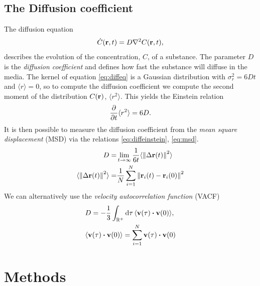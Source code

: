 \documentclass[%
aip,
jmp,%
amsmath,amssymb,
preprint,%
reprint,%
notitlepage,
a4paper]{revtex4-1}
\newcommand{\average}[1]{\langle #1 \rangle}
\begin{document}
\subsection{The Diffusion coefficient}
The diffusion equation
\begin{equation}
\dot{C}(\vb{r}, t) = D\nabla^2C(\vb{r}, t),
\label{eq:diffeq}
\end{equation}
describes the evolution of the concentration, $C$, of a substance. The parameter $D$ is the \textit{diffusion coefficient} and defines how fast the substance will diffuse in the media. The kernel of equation \ref{eq:diffeq} is a Gaussian distribution with $\sigma_r^2 = 6Dt$ and $\langle r\rangle=0$, so to compute the diffusion coefficient we compute the second moment of the distribution $C(\vb{r})$, $\langle r^2\rangle$. This yields the Einstein relation\cite{Einstein1905}
\begin{equation}
\pdv{t}\langle r^2\rangle = 6D.
\end{equation}
It is then possible to measure the diffusion coefficient from the \textit{mean square displacement} (MSD) via the relations \ref{eq:diffeinstein}, \ref{eq:msd}.
\begin{align}
\label{eq:diffeinstein}
D =& \lim_{t\rightarrow\infty} \frac{1}{6t}\langle\norm{\Delta\vb{r}(t)}^2\rangle\\
\label{eq:msd}
\langle\norm{\Delta\vb{r}(t)}^2\rangle =& \frac{1}{N}\sum_{i = 1}^{N}\norm{ \vb{r}_i(t) - \vb{r}_i(0)}^2
\end{align}
We can alternatively use the \textit{velocity autocorrelation function} (VACF)\cite{Kubo1957}
\begin{align}
\label{eq:diffvacf}
&D = -\frac{1}{3}\int_{\mathbb{R}^+}\dd{\tau} \langle \vb{v}(\tau)\dotproduct\vb{v}(0)\rangle,\\
&\average{\vb{v}(\tau)\dotproduct\vb{v}(0)} = \sum_{i = 1}^N \vb{v}(\tau)\dotproduct\vb{v}(0)
\end{align}
\section{Methods}
\end{document}
